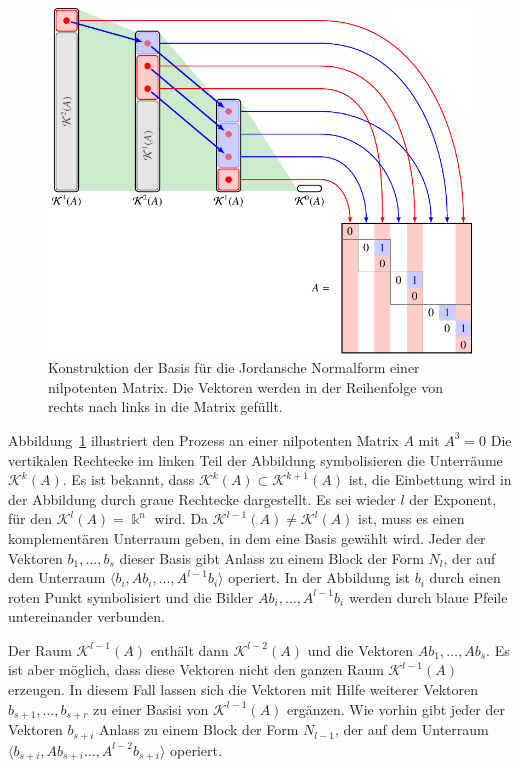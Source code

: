 \begin{figure}
\centering
\includegraphics{chapters/40-eigenwerte/images/normalform.pdf}
\caption{Konstruktion der Basis für die Jordansche Normalform einer
nilpotenten Matrix.
Die Vektoren werden in der Reihenfolge von rechts nach links in die
Matrix gefüllt.
\label{buch:eigenwerte:fig:normalform}}
\end{figure}

Abbildung~\ref{buch:eigenwerte:fig:normalform} illustriert den Prozess
an einer nilpotenten Matrix $A$ mit $A^3=0$
Die vertikalen Rechtecke im linken Teil der Abbildung symbolisieren
die Unterräume $\mathcal{K}^k(A)$.
Es ist bekannt, dass $\mathcal{K}^k(A) \subset \mathcal{K}^{k+1}(A)$ ist,
die Einbettung wird in der Abbildung durch graue Rechtecke dargestellt.
Es sei wieder $l$ der Exponent, für den $\mathcal{K}^l(A)=\Bbbk^n$ wird.
Da $\mathcal{K}^{l-1}(A)\ne \mathcal{K}^l(A)$ ist, muss es einen
komplementären Unterraum geben, in dem eine Basis gewählt wird.
Jeder der Vektoren $b_1,\dots,b_s$ dieser Basis gibt Anlass zu einem
Block der Form $N_l$, der auf dem Unterraum 
$\langle b_i,Ab_i,\dots,A^{l-1}b_i\rangle$ operiert.
In der Abbildung ist $b_i$ durch einen roten Punkt symbolisiert und
die Bilder $Ab_i,\dots,A^{l-1}b_i$ werden durch blaue Pfeile untereinander
verbunden.

Der Raum $\mathcal{K}^{l-1}(A)$ enthält dann $\mathcal{K}^{l-2}(A)$ und
die Vektoren $Ab_1,\dots,Ab_s$.
Es ist aber möglich, dass diese Vektoren nicht den ganzen Raum
$\mathcal{K}^{l-1}(A)$ erzeugen.
In diesem Fall lassen sich die Vektoren mit Hilfe weiterer Vektoren
$b_{s+1},\dots,b_{s+r}$ zu einer Basisi von $\mathcal{K}^{l-1}(A)$
ergänzen.
Wie vorhin gibt jeder der Vektoren $b_{s+i}$ Anlass zu einem Block
der Form $N_{l-1}$, der auf dem Unterraum
$\langle b_{s+i},Ab_{s+i}\dots,A^{l-2}b_{s+i}\rangle$
operiert.

